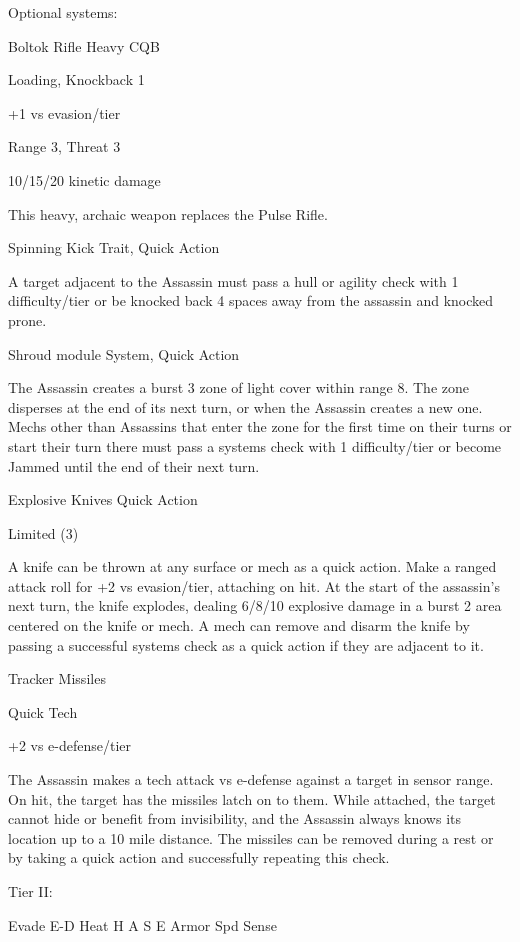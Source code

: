 Optional systems:
 
Boltok Rifle  
Heavy CQB
 
Loading, Knockback 1
 
+1 vs evasion/tier
 
Range 3, Threat 3
 
10/15/20 kinetic damage
 
This heavy, archaic weapon replaces the Pulse Rifle.
 

Spinning Kick  
Trait, Quick Action
 
A target adjacent to the Assassin must pass a hull or agility check with 1 difficulty/tier or be  
knocked back 4 spaces away from the assassin and knocked prone.
 

Shroud module  
System, Quick Action
 
The Assassin creates a burst 3 zone of light cover within range 8. The zone disperses at the end  
of its next turn, or when the Assassin creates a new one. Mechs other than Assassins that enter  
the zone for the first time on their turns or start their turn there must pass a systems check with 1  
difficulty/tier or become Jammed until the end of their next turn.
 

Explosive Knives  
Quick Action
 
Limited (3)
 
A knife can be thrown at any surface or mech as a quick action. Make a ranged attack roll for +2  
vs evasion/tier, attaching on hit. At the start of the assassin’s next turn, the knife explodes,  
dealing 6/8/10 explosive damage in a burst 2 area centered on the knife or mech. A mech can  
remove and disarm the knife by passing a successful systems check as a quick action if they are  
adjacent to it.
 

Tracker Missiles
 
Quick Tech
 
+2 vs e-defense/tier
 
The Assassin makes a tech attack vs e-defense against a target in sensor range. On hit, the  
target has the missiles latch on to them. While attached, the target cannot hide or benefit from  
invisibility, and the Assassin always knows its location up to a 10 mile distance. The missiles can  
be removed during a rest or by taking a quick action and successfully repeating this check.
 

Tier II:
 

          Evade     E-D    Heat    H    A     S     E       Armor        Spd       Sense 

